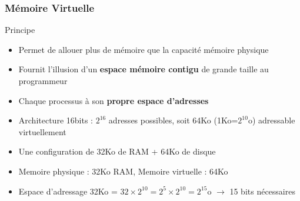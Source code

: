 \documentclass[8pt]{beamer}
\begin{document}
\begin{frame}
    \frametitle{Mémoire Virtuelle}
    \begin{block}{Principe}
        \begin{itemize}
            \item Permet de \fg{} allouer plus de mémoire
                  que
                  la
                  capacité mémoire physique
            \item Fournit l’illusion d’un \textbf{espace mémoire
                      contigu} de grande taille au programmeur
            \item Chaque processus \`a son \textbf{propre espace
                      d'adresses}

        \end{itemize}
    \end{block}
    \begin{exampleblock}{}
        \begin{itemize}
            \item Architecture 16bits : $2^{16}$ adresses possibles, soit 64Ko
                  (1Ko=$2^{10}$o) adressable virtuellement
            \item Une configuration de 32Ko de RAM + 64Ko de disque
            \item Memoire physique : 32Ko RAM, Memoire virtuelle : 64Ko
            \item Espace d'adressage 32Ko = $32 \times 2^{10} = 2^5
                      \times2^{10} = 2^{15}$o $\to$ 15 bits n\'ecessaires
        \end{itemize}
    \end{exampleblock}
\end{frame}
\end{document}
